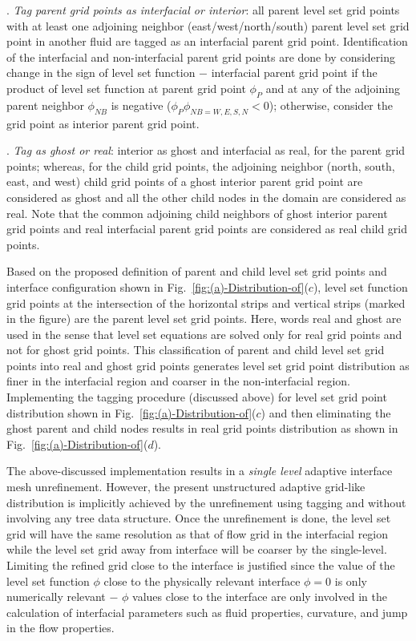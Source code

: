 \documentclass[preprint,12pt]{elsarticle}
\begin{document}
. \textit{Tag parent grid points as interfacial or interior}:
all parent level set grid points with at least one adjoining neighbor
(east/west/north/south) parent level set grid point in another fluid
are tagged as an interfacial parent grid point. Identification of
the interfacial and non-interfacial parent grid points are done by
considering change in the sign of level set function $-$  interfacial
parent grid point if the product of level set function at parent grid
point $\phi_{P}$ and at any of the adjoining parent neighbor $\phi_{NB}$
is negative ($\phi_{P}\phi_{NB=W,E,S,N}<0$); otherwise, consider
the grid point as interior parent grid point.

. \textit{Tag as ghost or real}: interior as ghost and
interfacial as real, for the parent grid points; whereas, for the
child grid points, the adjoining neighbor (north, south, east, and
west) child grid points of a ghost interior parent grid point are
considered as ghost and all the other child nodes in the domain are
considered as real. Note that the common adjoining child neighbors
of ghost interior parent grid points and real interfacial parent grid
points are considered as real child grid points.





Based on the proposed definition of parent and child level set grid
points and interface configuration shown in Fig.~\ref{fig:(a)-Distribution-of}($c$),
level set function grid points at the intersection of the  horizontal strips
and vertical strips (marked in the figure)  are the parent level set grid points. Here, words
real and ghost are used in the sense that level set equations are
solved only for real grid points and not for ghost grid points. This
classification of parent and child level set grid points into real
and ghost grid points  generates  level set grid point distribution
as finer in the interfacial region and coarser  in the non-interfacial
region. Implementing the  tagging procedure (discussed above) for
level set grid point distribution shown in Fig.~\ref{fig:(a)-Distribution-of}($c$)
and then eliminating the ghost parent and child nodes results in real
grid points distribution  as shown in Fig.~\ref{fig:(a)-Distribution-of}($d$). 

The above-discussed implementation  results in a \textit{single level}
 adaptive interface mesh unrefinement. However, the present unstructured
adaptive grid-like distribution is implicitly achieved by the unrefinement
using tagging and without involving any tree data structure. Once
the unrefinement is done, the level set grid will have the same resolution
as that of flow grid in the interfacial region while the level set
grid away from interface will be coarser by the single-level.  Limiting
the refined grid close to the interface is justified since the value
of the level set function $\phi$ close to the physically relevant
interface $\phi=0$ is only numerically relevant $-$ $\phi$ values
close to the interface are only involved in the calculation of interfacial
parameters such as fluid properties, curvature, and jump in the flow
properties.
\end{document}
